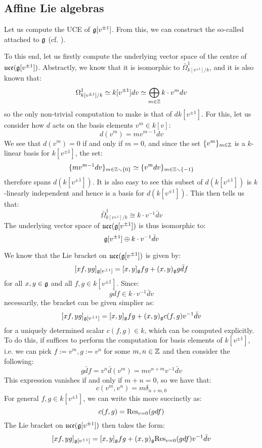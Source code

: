     \subsection{Affine Lie algebras}
        \begin{example} \label{example: affine_lie_algebras_centres}
            Let us compute the UCE of $\mathfrak{g}[v^{\pm 1}]$. From this, we can construct the so-called  attached to $\mathfrak{g}$ (cf. \cite[Chapter 7]{kac_infinite_dimensional_lie_algebras}). 

            To this end, let us firstly compute the underlying vector space of the centre of $\mathfrak{uce}(\mathfrak{g}[v^{\pm 1}])$. Abstractly, we know that it is isomorphic to $\bar{\Omega}^1_{k[v^{\pm 1}]/k}$, and it is also known that:
                $$\Omega^1_{k[v^{\pm 1}]/k} \simeq k[v^{\pm 1}] dv \simeq \bigoplus_{m \in \mathbb{Z}} k \cdot v^m dv$$
            so the only non-trivial computation to make is that of $d k[v^{\pm 1}]$. For this, let us consider how $d$ acts on the basis elements $v^m \in k[v]$:
                $$d(v^m) = m v^{m - 1} dv$$
            We see that $d(v^m) = 0$ if and only if $m = 0$, and since the set $\{v^m\}_{m \in \mathbb{Z}}$ is a $k$-linear basis for $k[v^{\pm 1}]$, the set:
                $$\{m v^{m - 1} dv\}_{m \in \mathbb{Z} \smallsetminus \{0\}} \simeq \{v^m dv\}_{m \in \mathbb{Z} \smallsetminus \{-1\}}$$
            therefore spans $d(k[v^{\pm 1}])$. It is also easy to see this subset of $d(k[v^{\pm 1}])$ is $k$-linearly independent and hence is a basis for $d(k[v^{\pm 1}])$. This then tells us that:
                $$\bar{\Omega}^1_{k[v^{\pm 1}]/k} \cong k \cdot v^{-1} \bar{d}v$$
            The underlying vector space of $\mathfrak{uce}(\mathfrak{g}[v^{\pm 1}])$ is thus isomorphic to:
                $$\mathfrak{g}[v^{\pm 1}] \oplus k \cdot v^{-1} \bar{d}v$$

            We know that the Lie bracket on $\mathfrak{uce}(\mathfrak{g}[v^{\pm 1}])$ is given by:
                $$[x f, y g]_{\mathfrak{g}[v^{\pm 1}]} = [x, y]_{\mathfrak{g}} fg + (x, y)_{\mathfrak{g}} g \bar{d}f$$
            for all $x, y \in \mathfrak{g}$ and all $f, g \in k[v^{\pm 1}]$. Since:
                $$g \bar{d}f \in k \cdot v^{-1} \bar{d}v$$
            necessarily, the bracket can be given simplier as:
                $$[x f, y g]_{\mathfrak{g}[v^{\pm 1}]} = [x, y]_{\mathfrak{g}} fg + (x, y)_{\mathfrak{g}} c(f, g) v^{-1} \bar{d}v$$
            for a uniquely determined scalar $c(f, g) \in k$, which can be computed explicitly. To do this, if suffices to perform the computation for basis elements of $k[v^{\pm 1}]$, i.e. we can pick $f := v^m, g := v^n$ for some $m, n \in \mathbb{Z}$ and then consider the following:
                $$g \bar{d}f = v^n \bar{d}(v^m) = m v^{n + m} v^{-1} \bar{d}v$$
            This expression vanishes if and only if $m + n = 0$, so we have that:
                $$c(v^m, v^n) = m \delta_{n + m, 0}$$
            For general $f, g \in k[v^{\pm 1}]$, we can write this more succinctly as:
                $$c(f, g) = \mathrm{Res}_{v = 0}( gdf )$$
            The Lie bracket on $\mathfrak{uce}(\mathfrak{g}[v^{\pm 1}])$ then takes the form:
                $$[x f, y g]_{\mathfrak{g}[v^{\pm 1}]} = [x, y]_{\mathfrak{g}} fg + (x, y)_{\mathfrak{g}} \mathrm{Res}_{v = 0}(g df) v^{-1} \bar{d}v$$
                

\end{example}

